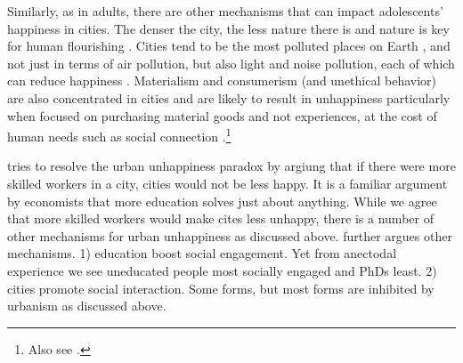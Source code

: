 \documentclass[10pt, letterpaper]{article}
\begin{document}
\begin{spacing}{1.4}
Similarly, as in adults,  there are other mechanisms that can impact
adolescents' happiness in cities. The denser the city, the less nature there is 
\citep{aokCityBook15} and nature is key for human flourishing \citep{pretty12}. Cities tend to be the most polluted places on Earth %
\citep{meyer13}, and not just in terms of air pollution, but also light and
noise pollution, each of which can reduce happiness \citep{signoretta19,poonCL18jan29,leeTT16feb13,metcalfeCL16jun10,weinhold12,rehdanz08,welsch05,york03}. Materialism and consumerism (and unethical behavior) are also concentrated in cities \citep[e.g.,][]{aok-sizeFetish17,okulicz2022materialism,morris21,wirth38} and
 are likely to result in unhappiness particularly when focused on purchasing
 material goods and not experiences,  at the cost of human needs such as social connection
 \citep[e.g.,][]{frank12,leonard10,vanboven05,burroughs02,dumludag21}.\footnote{Also see \citet{wu20,wang17,brown19,brown17}.}
  

\citet{morrison2024resolving} tries to resolve the urban unhappiness paradox by
argiung that if there were more skilled workers in a city, cities would not be
less happy. It is a familiar argument by economists that more education solves
just about anything. While we agree that more skilled workers would make cites
less unhappy, there is a number of other mechanisms for urban unhappiness as
discussed above. \citet{morrison2024resolving} further argues other mechanisms. 
1) education  boost social engagement. Yet from anectodal experience
we see uneducated people most socially engaged and PhDs least. 2) cities promote
social interaction. Some forms, but most forms are inhibited by urbanism as
discussed above.
 

\end{spacing}
\end{document}
